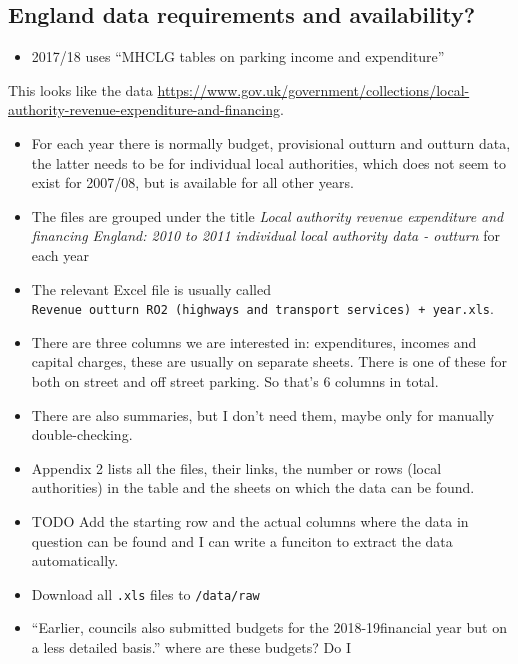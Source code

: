 \documentclass[]{article}
\providecommand{\tightlist}{%
  \setlength{\itemsep}{0pt}\setlength{\parskip}{0pt}}
\begin{document}
\hypertarget{england-data-requirements-and-availability}{%
\subsection{England data requirements and
availability?}\label{england-data-requirements-and-availability}}

\begin{itemize}
\tightlist
\item
  2017/18 uses ``MHCLG tables on parking income and expenditure''
\end{itemize}

This looks like the data
\href{here}{https://www.gov.uk/government/collections/local-authority-revenue-expenditure-and-financing}.

\begin{itemize}
\item
  For each year there is normally budget, provisional outturn and
  outturn data, the latter needs to be for individual local authorities,
  which does not seem to exist for 2007/08, but is available for all
  other years.
\item
  The files are grouped under the title \emph{Local authority revenue
  expenditure and financing England: 2010 to 2011 individual local
  authority data - outturn} for each year
\item
  The relevant Excel file is usually called
  \texttt{Revenue\ outturn\ RO2\ (highways\ and\ transport\ services)\ +\ year.xls}.
\item
  There are three columns we are interested in: expenditures, incomes
  and capital charges, these are usually on separate sheets. There is
  one of these for both on street and off street parking. So that's 6
  columns in total.
\item
  There are also summaries, but I don't need them, maybe only for
  manually double-checking.
\item
  Appendix 2 lists all the files, their links, the number or rows (local
  authorities) in the table and the sheets on which the data can be
  found.
\item
  TODO Add the starting row and the actual columns where the data in
  question can be found and I can write a funciton to extract the data
  automatically.
\item
  Download all \texttt{.xls} files to \texttt{/data/raw}
\item
  ``Earlier, councils also submitted budgets for the 2018-19financial
  year but on a less detailed basis.'' where are these budgets? Do I

\end{itemize}
\end{document}
